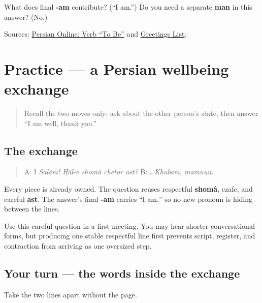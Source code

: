 \begin{tcolorbox}[breakable,colback=teal!4,colframe=teal!35!black,title={Before you move on}]
What does final \textbf{-am} contribute? (“I am.”) Do you need a separate \textbf{man} in this answer? (No.)

Sources: \href{https://sites.la.utexas.edu/persian\_online\_resources/verbs/verb-to-be/}{Persian Online: Verb “To Be”} and \href{https://sites.la.utexas.edu/persian\_online\_resources/vocabulary-lists/meetings-introductions/}{Greetings List}.
\end{tcolorbox}
\section[Practice]{Practice — a Persian wellbeing exchange}

\label{lesson:FA-C04-practice}



\begin{quote}
Recall the two moves only: ask about the other person's state, then answer “I am well, thank you.”
\end{quote}

\subsection*{The exchange}
\begin{quote}
A: \textbf{!    } \emph{Salâm! Hâl-e shomâ chetor ast?} B: \textbf{ .} \emph{Khubam, mamnun.}
\end{quote}

Every piece is already owned. The question reuses respectful \textbf{shomâ}, ezafe, and careful \textbf{ast}. The answer's final \textbf{-am} carries “I am,” so no new pronoun is hiding between the lines.

\begin{grammarlens}[title={Grammar Lens: keep the social choice visible}]
Use this careful question in a first meeting. You may hear shorter conversational forms, but producing one stable respectful line first prevents script, register, and contraction from arriving as one oversized step.
\end{grammarlens}

\subsection*{Your turn — the words inside the exchange}
Take the two lines apart without the page.

